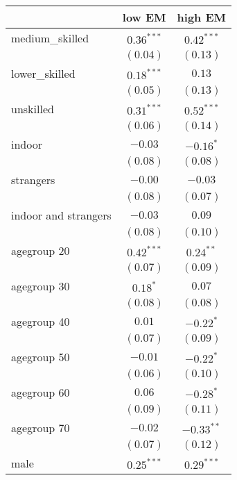
\begin{table}
\begin{center}
\begin{tabular}{l c c }
\hline
 & low EM & high EM \\
\hline
medium\_skilled      & $0.36^{***}$ & $0.42^{***}$  \\
                     & $(0.04)$     & $(0.13)$      \\
lower\_skilled       & $0.18^{***}$ & $0.13$        \\
                     & $(0.05)$     & $(0.13)$      \\
unskilled            & $0.31^{***}$ & $0.52^{***}$  \\
                     & $(0.06)$     & $(0.14)$      \\
indoor               & $-0.03$      & $-0.16^{*}$   \\
                     & $(0.08)$     & $(0.08)$      \\
strangers            & $-0.00$      & $-0.03$       \\
                     & $(0.08)$     & $(0.07)$      \\
indoor and strangers & $-0.03$      & $0.09$        \\
                     & $(0.08)$     & $(0.10)$      \\
agegroup 20          & $0.42^{***}$ & $0.24^{**}$   \\
                     & $(0.07)$     & $(0.09)$      \\
agegroup 30          & $0.18^{*}$   & $0.07$        \\
                     & $(0.08)$     & $(0.08)$      \\
agegroup 40          & $0.01$       & $-0.22^{*}$   \\
                     & $(0.07)$     & $(0.09)$      \\
agegroup 50          & $-0.01$      & $-0.22^{*}$   \\
                     & $(0.06)$     & $(0.10)$      \\
agegroup 60          & $0.06$       & $-0.28^{*}$   \\
                     & $(0.09)$     & $(0.11)$      \\
agegroup 70          & $-0.02$      & $-0.33^{**}$  \\
                     & $(0.07)$     & $(0.12)$      \\
male                 & $0.25^{***}$ & $0.29^{***}$  \\

\end{tabular}
\end{center}
\end{table}
